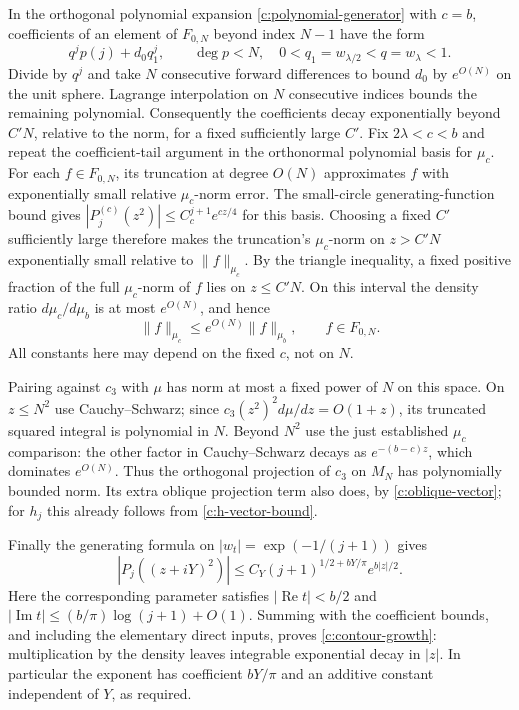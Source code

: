 In the orthogonal polynomial expansion
\eqref{c:polynomial-generator} with $c=b$,
coefficients of an element of $F_{0,N}$ beyond index $N-1$ have the
form
\[
 q^jp(j)+d_0q_1^j,\qquad \deg p<N,
 \quad 0<q_1=w_{\lambda/2}<q=w_\lambda<1.
\]
Divide by $q^j$ and take $N$ consecutive forward differences to bound
$d_0$ by $e^{O(N)}$ on the unit sphere.  Lagrange interpolation on
$N$ consecutive indices bounds the remaining polynomial.  Consequently
the coefficients decay exponentially beyond $C'N$, relative to the
norm, for a fixed sufficiently large $C'$.
Fix $2\lambda<c<b$ and repeat the coefficient-tail argument in the
orthonormal polynomial basis for $\mu_c$. For each $f\in F_{0,N}$,
its truncation at degree $O(N)$ approximates $f$ with exponentially
small relative $\mu_c$-norm error. The small-circle generating-function
bound gives $|P_j^{(c)}(z^2)|\le C_c^{j+1}e^{cz/4}$ for this basis.
Choosing a fixed $C'$ sufficiently large therefore makes the
truncation's $\mu_c$-norm on $z>C'N$ exponentially small relative to
$\|f\|_{\mu_c}$. By the triangle inequality, a fixed positive fraction
of the full $\mu_c$-norm of $f$ lies on $z\le C'N$. On this interval
the density ratio $d\mu_c/d\mu_b$ is at most $e^{O(N)}$, and hence
\[
 \|f\|_{\mu_c}\le e^{O(N)}\|f\|_{\mu_b},\qquad f\in F_{0,N}.
\]
All constants here may depend on the fixed $c$, not on $N$.

Pairing against $c_3$ with $\mu$ has norm at most a fixed power of
$N$ on this space.  On $z\le N^2$ use Cauchy--Schwarz; since
$c_3(z^2)^2d\mu/dz=O(1+z)$, its truncated squared integral is
polynomial in $N$.  Beyond $N^2$ use the just established $\mu_c$
comparison: the other factor in Cauchy--Schwarz decays as
$e^{-(b-c)z}$, which dominates $e^{O(N)}$.  Thus the orthogonal
projection of $c_3$ on $M_N$ has polynomially bounded norm.  Its
extra oblique projection term also does, by
\eqref{c:oblique-vector}; for $h_j$ this already follows from
\eqref{c:h-vector-bound}.

Finally the generating formula on
$|w_t|=\exp(-1/(j+1))$ gives
\[
 |P_j((z+iY)^2)|
 \le C_Y(j+1)^{1/2+bY/\pi}e^{b|z|/2}.
\]
Here the corresponding parameter satisfies
$|\operatorname{Re}t|<b/2$ and
$|\operatorname{Im}t|\le(b/\pi)\log(j+1)+O(1)$.
Summing with the coefficient bounds, and including the elementary
direct inputs, proves \eqref{c:contour-growth}: multiplication by the
density leaves integrable exponential decay in $|z|$.  In particular
the exponent has coefficient $bY/\pi$ and an additive constant
independent of $Y$, as required.

